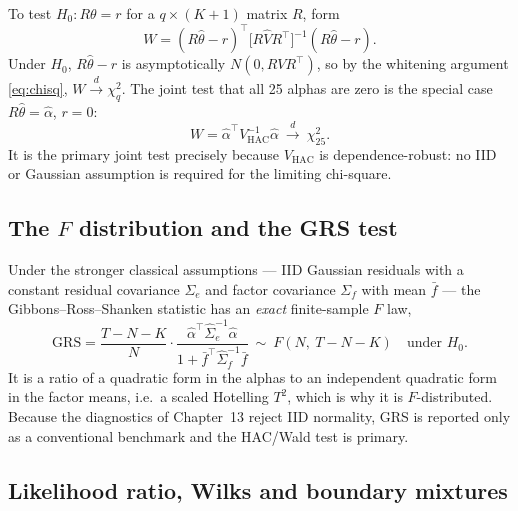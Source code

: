 To test $H_0:R\theta=r$ for a $q\times(K{+}1)$ matrix $R$, form
\begin{equation}
W=(R\hat\theta-r)^{\top}\bigl[R\hat V R^{\top}\bigr]^{-1}(R\hat\theta-r).
\end{equation}
Under $H_0$, $R\hat\theta-r$ is asymptotically $N(0,R V R^{\top})$, so by
the whitening argument \eqref{eq:chisq}, $W\xrightarrow{d}\chi^2_q$. The
joint test that all 25 alphas are zero is the special case
$R\hat\theta=\hat\alpha$, $r=0$:
\begin{equation}\label{eq:wald}
W=\hat\alpha^{\top}V_{\mathrm{HAC}}^{-1}\hat\alpha\ \xrightarrow{d}\ \chi^2_{25}.
\end{equation}
It is the primary joint test precisely because $V_{\mathrm{HAC}}$ is
dependence-robust: no IID or Gaussian assumption is required for the
limiting chi-square.

\subsection{The $F$ distribution and the GRS test}

Under the stronger classical assumptions --- IID Gaussian residuals with a
constant residual covariance $\Sigma_e$ and factor covariance $\Sigma_f$
with mean $\bar f$ --- the Gibbons--Ross--Shanken statistic has an
\emph{exact} finite-sample $F$ law,
\begin{equation}\label{eq:grs}
\mathrm{GRS}=\frac{T-N-K}{N}\cdot
\frac{\hat\alpha^{\top}\hat\Sigma_e^{-1}\hat\alpha}{1+\bar f^{\top}\hat\Sigma_f^{-1}\bar f}
\ \sim\ F(N,\ T-N-K)\quad\text{under }H_0 .
\end{equation}
It is a ratio of a quadratic form in the alphas to an independent
quadratic form in the factor means, i.e.\ a scaled Hotelling $T^2$, which
is why it is $F$-distributed. Because the diagnostics of Chapter~13 reject
IID normality, GRS is reported only as a conventional benchmark and the
HAC/Wald test is primary.

\subsection{Likelihood ratio, Wilks and boundary mixtures}

